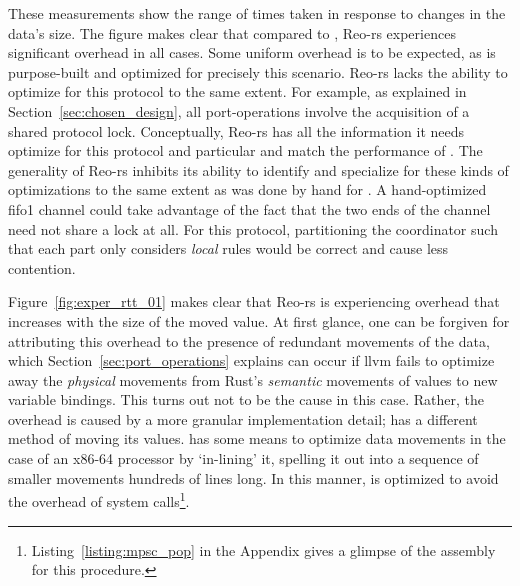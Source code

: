 These measurements show the range of times taken in response to changes in the data's size. The figure makes clear that compared to , Reo-rs experiences significant overhead in all cases. Some uniform overhead is to be expected, as  is purpose-built and optimized for precisely this scenario. Reo-rs lacks the ability to optimize for this protocol to the same extent. For example, as explained in Section~\ref{sec:chosen_design}, all port-operations involve the acquisition of a shared protocol lock. Conceptually, Reo-rs has all the information it needs optimize for this protocol and particular and match the performance of . The generality of Reo-rs inhibits its ability to identify and specialize for these kinds of optimizations to the same extent as was done by hand for . A hand-optimized fifo1 channel could take advantage of the fact that the two ends of the channel need not share a lock at all. For this protocol, partitioning the coordinator such that each part only considers \textit{local} rules would be correct and cause less contention.

Figure~\ref{fig:exper_rtt_01} makes clear that Reo-rs is experiencing overhead that increases with the size of the moved value. At first glance, one can be forgiven for attributing this overhead to the presence of redundant movements of the data, which Section~\ref{sec:port_operations} explains can occur if llvm fails to optimize away the \textit{physical} movements from Rust's \textit{semantic} movements of values to new variable bindings. This turns out not to be the cause in this case. Rather, the overhead is caused by a more granular implementation detail;  has a different method of moving its values.  has some means to optimize data movements in the case of an x86-64 processor by `in-lining' it, spelling it out into a sequence of smaller movements hundreds of lines long. In this manner,  is optimized to avoid the overhead of system calls\footnote{Listing~\ref{listing:mpsc_pop} in the Appendix gives a glimpse of the assembly for this procedure.}.


